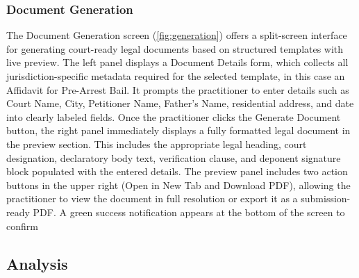 \subsubsection{Document Generation}

The Document Generation screen (\autoref{fig:generation}) offers a split-screen interface for generating court-ready legal documents based on structured templates with live preview. The left panel displays a Document Details form, which collects all jurisdiction-specific metadata required for the selected template, in this case an Affidavit for Pre-Arrest Bail. It prompts the practitioner to enter details such as Court Name, City, Petitioner Name, Father's Name, residential address, and date into clearly labeled fields. Once the practitioner clicks the Generate Document button, the right panel immediately displays a fully formatted legal document in the preview section. This includes the appropriate legal heading, court designation, declaratory body text, verification clause, and deponent signature block populated with the entered details. The preview panel includes two action buttons in the upper right (Open in New Tab and Download PDF), allowing the practitioner to view the document in full resolution or export it as a submission-ready PDF. A green success notification appears at the bottom of the screen to confirm

\subsection{Analysis}
\label{subsec:analysis}


